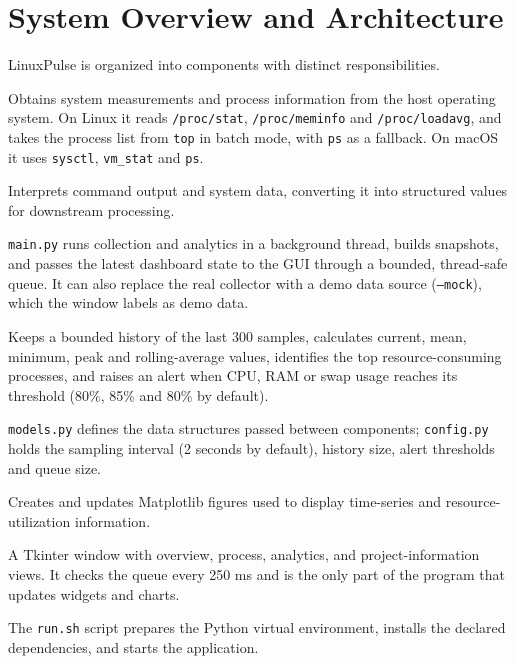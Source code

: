 \documentclass[11pt,a4paper]{article}
\begin{document}
\section{System Overview and Architecture}

LinuxPulse is organized into components with distinct responsibilities.

\begin{description}[style=nextline]
    \item[Collector]
    Obtains system measurements and process information from the host operating
    system. On Linux it reads \texttt{/proc/stat}, \texttt{/proc/meminfo} and
    \texttt{/proc/loadavg}, and takes the process list from \texttt{top} in batch
    mode, with \texttt{ps} as a fallback. On macOS it uses \texttt{sysctl},
    \texttt{vm\_stat} and \texttt{ps}.

    \item[Parser]
    Interprets command output and system data, converting it into structured
    values for downstream processing.

    \item[Controller]
    \texttt{main.py} runs collection and analytics in a background thread, builds
    snapshots, and passes the latest dashboard state to the GUI through a bounded,
    thread-safe queue. It can also replace the real collector with a demo data
    source (\texttt{--mock}), which the window labels as demo data.

    \item[Analytics]
    Keeps a bounded history of the last 300 samples, calculates current, mean,
    minimum, peak and rolling-average values, identifies the top
    resource-consuming processes, and raises an alert when CPU, RAM or swap usage
    reaches its threshold (80\%, 85\% and 80\% by default).

    \item[Models and configuration]
    \texttt{models.py} defines the data structures passed between components;
    \texttt{config.py} holds the sampling interval (2 seconds by default), history
    size, alert thresholds and queue size.

    \item[Visualization]
    Creates and updates Matplotlib figures used to display time-series and
    resource-utilization information.

    \item[GUI]
    A Tkinter window with overview, process, analytics, and project-information
    views. It checks the queue every 250 ms and is the only part of the program
    that updates widgets and charts.

    \item[Launcher]
    The \texttt{run.sh} script prepares the Python virtual environment,
    installs the declared dependencies, and starts the application.
\end{description}
\end{document}
